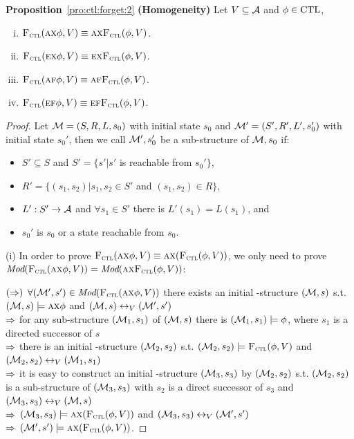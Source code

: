 \documentclass{article}
\begin{document}
\textbf{Proposition}~\ref{pro:ctl:forget:2} \textbf{(Homogeneity)}
Let $V\subseteq\cal A$ and $\phi \in \textrm{CTL}$,%
  \begin{enumerate}[(i)]
    \item ${\textsc{F}_{\textsc{ctl}}}(\textsc{a}\textsc{x}\phi,V)\equiv \textsc{a}\textsc{x} {\textsc{F}_{\textsc{ctl}}}(\phi,V)$.
    \item ${\textsc{F}_{\textsc{ctl}}}(\textsc{e}\textsc{x}\phi,V)\equiv\textsc{e}\textsc{x} {\textsc{F}_{\textsc{ctl}}}(\phi,V)$.
    \item ${\textsc{F}_{\textsc{ctl}}}(\textsc{a} \textsc{f}\phi,V)\equiv \textsc{a} \textsc{f} {\textsc{F}_{\textsc{ctl}}}(\phi,V)$.
    \item ${\textsc{F}_{\textsc{ctl}}}(\textsc{e}\textsc{f}\phi,V)\equiv\textsc{e}\textsc{f} {\textsc{F}_{\textsc{ctl}}}(\phi,V)$.
  \end{enumerate}
\begin{proof}
Let ${\cal M}=(S, R, L,s_0)$ with initial state $s_0$ and ${\cal M}'=(S', R', L',s_0')$ with initial state $s_0'$, then we call ${\cal M}', s_0'$ be a sub-structure of ${\cal M},s_0$ if:
\begin{itemize}
  \item $S' \subseteq S$ and $S'=\{s' | s'$ is reachable from $s_0'\}$,
  \item $R' =\{(s_1, s_2)| s_1, s_2 \in S'$ and $(s_1, s_2) \in R\}$,
  \item $L': S' \rightarrow {\cal A}$ and $\forall s_1 \in S'$ there is $L'(s_1) = L(s_1)$, and
  \item $s_0'$ is $s_0$ or a state reachable from $s_0$.
\end{itemize}

(i) In order to prove ${\textsc{F}_{\textsc{ctl}}}(\textsc{a} \textsc{x} \phi, V) \equiv \textsc{a} \textsc{x}({\textsc{F}_{\textsc{ctl}}}(\phi, V))$, we only need to prove $\textit{Mod}({\textsc{F}_{\textsc{ctl}}}(\textsc{a} \textsc{x} \phi, V)) = \textit{Mod}( \textsc{a}\textsc{x}{\textsc{F}_{\textsc{ctl}}}(\phi, V))$:

$(\Rightarrow)$ $\forall ({\cal M}', s') \in \textit{Mod}({\textsc{F}_{\textsc{ctl}}}(\textsc{a} \textsc{x} \phi, V))$ there exists an initial \MPK-structure $({\cal M}, s)$ s.t. $({\cal M}, s)\models \textsc{a} \textsc{x} \phi$ and $({\cal M}, s) \leftrightarrow_V ({\cal M}',s')$\\
$\Rightarrow$ for any sub-structure $({\cal M}_1, s_1)$ of $({\cal M}, s)$ there is $({\cal M}_1, s_1) \models \phi$, where $s_1$ is a directed successor of $s$ \\
$\Rightarrow$ there is an initial \MPK-structure $({\cal M}_2, s_2)$ s.t. $({\cal M}_2, s_2) \models {\textsc{F}_{\textsc{ctl}}}(\phi,V)$ and $({\cal M}_2, s_2) \leftrightarrow_V ({\cal M}_1,s_1)$\\
$\Rightarrow$ it is easy to construct an initial \MPK-structure $({\cal M}_3, s_3)$ by $({\cal M}_2, s_2)$ s.t. $({\cal M}_2, s_2)$ is a sub-structure of $({\cal M}_3, s_3)$ with $s_2$ is a direct successor of $s_3$ and $({\cal M}_3, s_3) \leftrightarrow_V ({\cal M},s)$\\
$\Rightarrow$ $({\cal M}_3, s_3) \models \textsc{a} \textsc{x} ({\textsc{F}_{\textsc{ctl}}}(\phi,V))$ and $({\cal M}_3, s_3) \leftrightarrow_V ({\cal M}',s')$\\
$\Rightarrow$ $({\cal M}', s') \models \textsc{a} \textsc{x} ({\textsc{F}_{\textsc{ctl}}}(\phi,V))$.


\end{proof}
\end{document}
